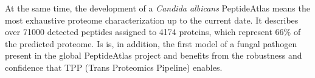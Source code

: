 At the same time, the development of a \textit{Candida albicans} PeptideAtlas
means the most exhaustive proteome characterization up to the current date.
It describes over 71000 detected peptides assigned to 4174 proteins, which
represent 66\% of the predicted proteome. Is is, in addition, the first 
model of a fungal pathogen present in the global PeptideAtlas project and
benefits from the robustness and confidence that TPP (Trans Proteomics Pipeline)
enables.

\endinput
